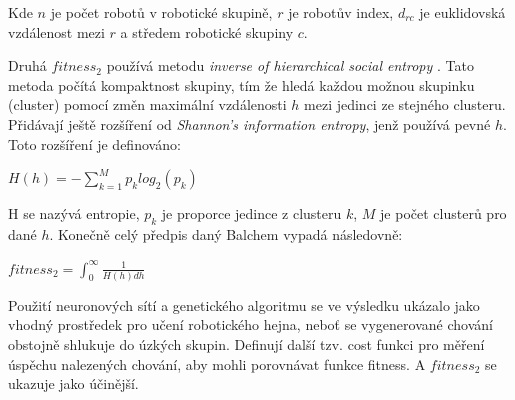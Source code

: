 Kde $n$ je počet robotů v robotické skupině, $r$ je robotův index, $d_{rc}$ je euklidovská vzdálenost mezi $r$ a středem robotické skupiny $c$. 
\par
Druhá $fitness_2$ používá metodu \textit{inverse of hierarchical social entropy} \citep{balch2000hierarchic}. Tato metoda počítá kompaktnost skupiny, tím že hledá každou možnou skupinku (cluster) pomocí změn maximální vzdálenosti $h$ mezi jedinci ze stejného clusteru. Přidávají ještě rozšíření od \textit{Shannon's information entropy}, jenž používá pevné $h$. Toto rozšíření je definováno: 
\par 
\begin{center}
\textbf{$H(h)=-\sum\limits_{k=1}^{M} p_k log_2(p_k)$}
\end{center}
\par 
H se nazývá entropie, $p_k$ je proporce jedince z clusteru $k$, $M$ je počet clusterů pro dané $h$. Konečně celý předpis daný Balchem vypadá následovně: 
\par
\begin{center}
\textbf{$fitness_2 = \int_{0}^{\infty} \frac{1}{H(h)dh}$}
\end{center}
\par 
Použití neuronových sítí a genetického algoritmu se ve výsledku ukázalo jako vhodný prostředek pro učení robotického hejna, neboť se vygenerované chování obstojně shlukuje do úzkých skupin. Definují další tzv. cost funkci pro měření úspěchu nalezených chování, aby mohli porovnávat funkce fitness. A $fitness_2$ se ukazuje jako účinější. 
